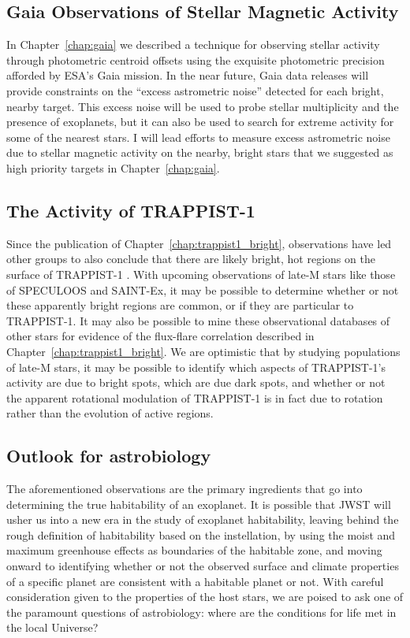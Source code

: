 \subsection{Gaia Observations of Stellar Magnetic Activity}

In Chapter~\ref{chap:gaia} we described a technique for observing stellar activity through photometric centroid offsets using the exquisite photometric precision afforded by ESA's Gaia mission. In the near future, Gaia data releases will provide constraints on the ``excess astrometric noise'' detected for each bright, nearby target. This excess noise will be used to probe stellar multiplicity and the presence of exoplanets, but it can also be used to search for extreme activity for some of the nearest stars. I will lead efforts to measure excess astrometric noise due to stellar magnetic activity on the nearby, bright stars that we suggested as high priority targets in Chapter~\ref{chap:gaia}. 

\subsection{The Activity of TRAPPIST-1}

Since the publication of Chapter~\ref{chap:trappist1_bright}, observations have led other groups to also conclude that there are likely bright, hot regions on the surface of TRAPPIST-1 \citep{Ducrot2018, Wakeford2019}. With upcoming observations of late-M stars like those of SPECULOOS and SAINT-Ex, it may be possible to determine whether or not these apparently bright regions are common, or if they are particular to TRAPPIST-1. It may also be possible to mine these observational databases of other stars for evidence of the flux-flare correlation described in Chapter~\ref{chap:trappist1_bright}. We are optimistic that by studying populations of late-M stars, it may be possible to identify which aspects of TRAPPIST-1's activity are due to bright spots, which are due dark spots, and whether or not the apparent rotational modulation of TRAPPIST-1 is in fact due to rotation rather than the evolution of active regions. 

\subsection{Outlook for astrobiology}

The aforementioned observations are the primary ingredients that go into determining the true habitability of an exoplanet. It is possible that JWST will usher us into a new era in the study of exoplanet habitability, leaving behind the rough definition of habitability based on the instellation, by using the moist and maximum greenhouse effects as boundaries of the habitable zone, and moving onward to identifying whether or not the observed surface and climate properties of a specific planet are consistent with a habitable planet or not. With careful consideration given to the properties of the host stars, we are poised to ask one of the paramount questions of astrobiology: where are the conditions for life met in the local Universe?
